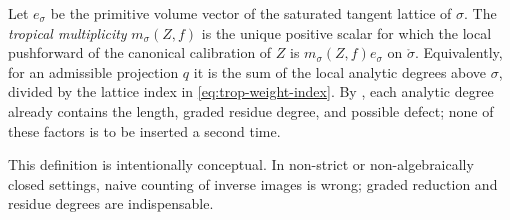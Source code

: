 \begin{definition}
\label{def:trop-cycle-multiplicity}
Let $e_\sigma$ be the primitive volume vector of the saturated tangent
lattice of $\sigma$. The \emph{tropical multiplicity}
$m_\sigma(Z,f)$ is the unique positive scalar for which the local
pushforward of the canonical calibration of $Z$ is
$m_\sigma(Z,f)e_\sigma$ on $\mathring\sigma$. Equivalently, for an
admissible projection $q$ it is the sum of the local analytic degrees above
$\sigma$, divided by the lattice index in
\eqref{eq:trop-weight-index}. By , each analytic
degree already contains the length, graded residue degree, and possible
defect; none of these factors is to be inserted a second time.
\end{definition}

This definition is intentionally conceptual. In non-strict or non-algebraically
closed settings, naive counting of inverse images is wrong; graded reduction
and residue degrees are indispensable.

